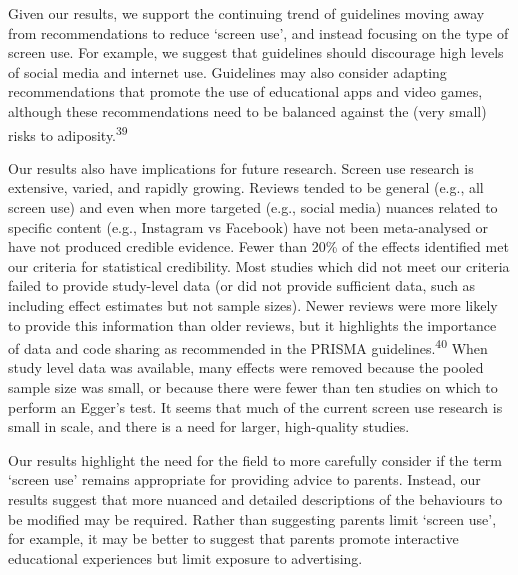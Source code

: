 \documentclass[
  english,
  man]{apa6}
\begin{document}
Given our results, we support the continuing trend of guidelines moving away from recommendations to reduce `screen use', and instead focusing on the type of screen use.
For example, we suggest that guidelines should discourage high levels of social media and internet use.
Guidelines may also consider adapting recommendations that promote the use of educational apps and video games, although these recommendations need to be balanced against the (very small) risks to adiposity.\textsuperscript{39}

Our results also have implications for future research.
Screen use research is extensive, varied, and rapidly growing.
Reviews tended to be general (e.g., all screen use) and even when more targeted (e.g., social media) nuances related to specific content (e.g., Instagram vs Facebook) have not been meta-analysed or have not produced credible evidence.
Fewer than 20\% of the effects identified met our criteria for statistical credibility.
Most studies which did not meet our criteria failed to provide study-level data (or did not provide sufficient data, such as including effect estimates but not sample sizes).
Newer reviews were more likely to provide this information than older reviews, but it highlights the importance of data and code sharing as recommended in the PRISMA guidelines.\textsuperscript{40}
When study level data was available, many effects were removed because the pooled sample size was small, or because there were fewer than ten studies on which to perform an Egger's test.
It seems that much of the current screen use research is small in scale, and there is a need for larger, high-quality studies.

Our results highlight the need for the field to more carefully consider if the term `screen use' remains appropriate for providing advice to parents.
Instead, our results suggest that more nuanced and detailed descriptions of the behaviours to be modified may be required.
Rather than suggesting parents limit `screen use', for example, it may be better to suggest that parents promote interactive educational experiences but limit exposure to advertising.
\end{document}
